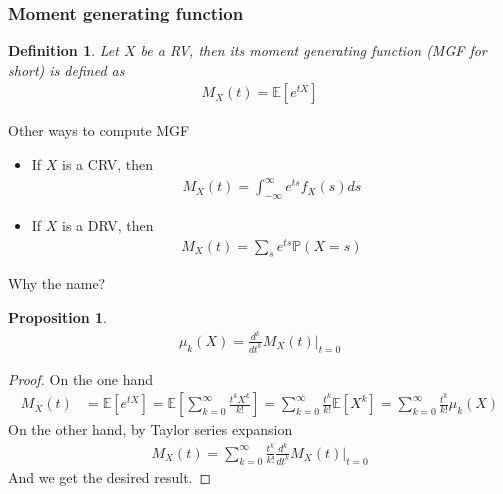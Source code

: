 \documentclass[10pt]{article}
\newtheorem*{proposition}{Proposition}
\newtheorem*{definition}{Definition}
\begin{document}
\subsubsection{Moment generating function}

\begin{definition}
Let $X$ be a RV, then its moment generating function (MGF for short) is defined as
\begin{align}
M_X(t)=\mathbb{E}[e^{tX}]
\end{align}
\end{definition}

Other ways to compute MGF

\begin{itemize}
\item If $X$ is a CRV, then
\begin{align}
M_X(t)=\int_{-\infty}^\infty e^{ts}f_X(s)ds
\end{align}
\item If $X$ is a DRV, then
\begin{align}
M_X(t)=\sum_s e^{ts}\mathbb{P}(X=s)
\end{align}
\end{itemize}

Why the name?

\begin{proposition}
\begin{align}
\mu_k(X)=\frac{d^k}{dt^k}M_X(t)\Biggl|_{t=0}
\end{align}
\end{proposition}

\begin{proof}
On the one hand
\begin{align}
M_X(t)
&=\mathbb{E}[e^{tX}]
=\mathbb{E}[\sum_{k=0}^\infty\frac{t^k X^k}{k!}]
=\sum_{k=0}^\infty\frac{t^k}{k!}\mathbb{E}[X^k]
=\sum_{k=0}^\infty\frac{t^k}{k!}\mu_k(X)
\end{align}
On the other hand, by Taylor series expansion
\begin{align}
M_X(t)=\sum_{k=0}^\infty\frac{t^k}{k!} \frac{d^k}{dt^k}M_X(t)\Biggl|_{t=0}
\end{align}
And we get the desired result.
\end{proof}
\end{document}
